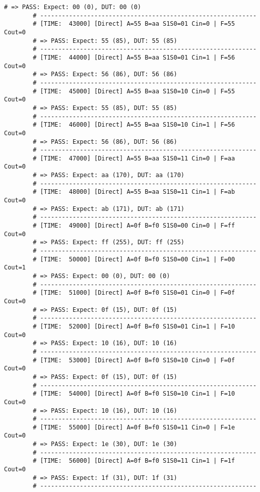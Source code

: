 \begin{itemize}[label=-]
\begin{lstlisting}[style=StyleResult, language=Result, caption={Kết quả mô phỏng Directed Test.}]
		# => PASS: Expect: 00 (0), DUT: 00 (0)
		# ------------------------------------------------------------
		# [TIME:  43000] [Direct] A=55 B=aa S1S0=01 Cin=0 | F=55 Cout=0
		# => PASS: Expect: 55 (85), DUT: 55 (85)
		# ------------------------------------------------------------
		# [TIME:  44000] [Direct] A=55 B=aa S1S0=01 Cin=1 | F=56 Cout=0
		# => PASS: Expect: 56 (86), DUT: 56 (86)
		# ------------------------------------------------------------
		# [TIME:  45000] [Direct] A=55 B=aa S1S0=10 Cin=0 | F=55 Cout=0
		# => PASS: Expect: 55 (85), DUT: 55 (85)
		# ------------------------------------------------------------
		# [TIME:  46000] [Direct] A=55 B=aa S1S0=10 Cin=1 | F=56 Cout=0
		# => PASS: Expect: 56 (86), DUT: 56 (86)
		# ------------------------------------------------------------
		# [TIME:  47000] [Direct] A=55 B=aa S1S0=11 Cin=0 | F=aa Cout=0
		# => PASS: Expect: aa (170), DUT: aa (170)
		# ------------------------------------------------------------
		# [TIME:  48000] [Direct] A=55 B=aa S1S0=11 Cin=1 | F=ab Cout=0
		# => PASS: Expect: ab (171), DUT: ab (171)
		# ------------------------------------------------------------
		# [TIME:  49000] [Direct] A=0f B=f0 S1S0=00 Cin=0 | F=ff Cout=0
		# => PASS: Expect: ff (255), DUT: ff (255)
		# ------------------------------------------------------------
		# [TIME:  50000] [Direct] A=0f B=f0 S1S0=00 Cin=1 | F=00 Cout=1
		# => PASS: Expect: 00 (0), DUT: 00 (0)
		# ------------------------------------------------------------
		# [TIME:  51000] [Direct] A=0f B=f0 S1S0=01 Cin=0 | F=0f Cout=0
		# => PASS: Expect: 0f (15), DUT: 0f (15)
		# ------------------------------------------------------------
		# [TIME:  52000] [Direct] A=0f B=f0 S1S0=01 Cin=1 | F=10 Cout=0
		# => PASS: Expect: 10 (16), DUT: 10 (16)
		# ------------------------------------------------------------
		# [TIME:  53000] [Direct] A=0f B=f0 S1S0=10 Cin=0 | F=0f Cout=0
		# => PASS: Expect: 0f (15), DUT: 0f (15)
		# ------------------------------------------------------------
		# [TIME:  54000] [Direct] A=0f B=f0 S1S0=10 Cin=1 | F=10 Cout=0
		# => PASS: Expect: 10 (16), DUT: 10 (16)
		# ------------------------------------------------------------
		# [TIME:  55000] [Direct] A=0f B=f0 S1S0=11 Cin=0 | F=1e Cout=0
		# => PASS: Expect: 1e (30), DUT: 1e (30)
		# ------------------------------------------------------------
		# [TIME:  56000] [Direct] A=0f B=f0 S1S0=11 Cin=1 | F=1f Cout=0
		# => PASS: Expect: 1f (31), DUT: 1f (31)
		# ------------------------------------------------------------
	\end{lstlisting}
	

\end{itemize}
